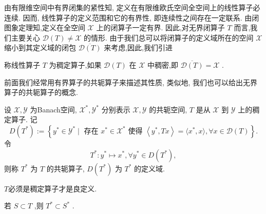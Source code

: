 \documentclass[lang=cn,newtx,10pt,scheme=chinese,thmcnt=chapter]{elegantbook}
\begin{document}
由有限维空间中有界闭集的紧性知, 定义在有限维欧氏空间全空间上的线性算子必连续. 因而, 线性算子的定义范围和它的有界性, 即连续性之间存在一定联系. 由闭图象定理知,定义在全空间 \(\mathcal{X}\) 上的闭算子一定有界. 因此,对无界闭算子 \(T\) 而言,我们主要关心 \(\mathcal{D}(T)  \neq  \mathcal{X}\) 的情形. 由于我们总可以将闭算子的定义域所在的空间 \(\mathcal{X}\) 缩小到其定义域的闭包 \(\overline{\mathcal{D}(T) }\) 来考虑,因此,我们引进
\begin{definition}
    称线性算子 \(T\) 为稠定算子,如果 \(\mathcal{D}(T)\) 在 \(\mathcal{X}\) 中稠密,即 \(\overline{\mathcal{D}(T) } = \mathcal{X}\) .
\end{definition}


前面我们经常用有界算子的共轭算子来描述其性质, 类似地, 我们也可以给出无界算子的共轭算子的概念.
\begin{definition}
    设 \(\mathcal{X},\mathcal{Y}\) 为Banach空间, \({\mathcal{X}}^{ * },{\mathcal{Y}}^{ * }\) 分别表示 \(\mathcal{X},\mathcal{Y}\) 的共轭空间, \(T\) 是从 \(\mathcal{X}\) 到 \(\mathcal{Y}\) 上的稠定算子. 记
\begin{equation*}
D\left( {T}^{ * }\right)  \mathrel{\text{ := }} \left\{  {{y}^{ * } \in  {\mathcal{Y}}^{ * } \mid  \text{ 存在 }x^*\in \mathcal{X}^*\text{ 使得 }\left\langle  {{y}^{ * },{Tx}}\right\rangle=\langle x^*,x\rangle,\forall x \in  \mathcal{D}(T) }\right\}  . \label{5.1}
\end{equation*}
令
\begin{equation*}
{T}^{ * } : {y}^{ * } \mapsto  {x}^{ * },\forall {y}^{ * } \in  D\left( {T}^{ * }\right) ,
\end{equation*}
则称 \({T}^{ * }\) 为 \(T\) 的共轭算子, \(D\left( {T}^{ * }\right)\) 为 \({T}^{ * }\) 的定义域.

\end{definition}
\begin{note}
    $T$必须是稠定算子才是良定义.
    
    若 \(S \subset  T\) ,则 \({T}^{ * } \subset  {S}^{ * }\) .
\end{note}
\end{document}

